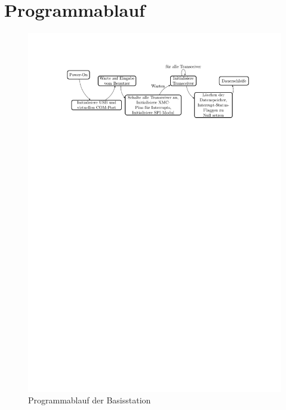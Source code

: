 \section{Programmablauf}
\begin{figure}[t]
\centering
\includegraphics[width=0.7\linewidth, trim=3.2cm 22.7cm 2.5cm 2.5cm,clip=true]{Abbildungen/Blockdiagramme/Initialisierung}
\caption{Programmablauf der Basisstation}
\label{fig:initialisierung}
\end{figure}

